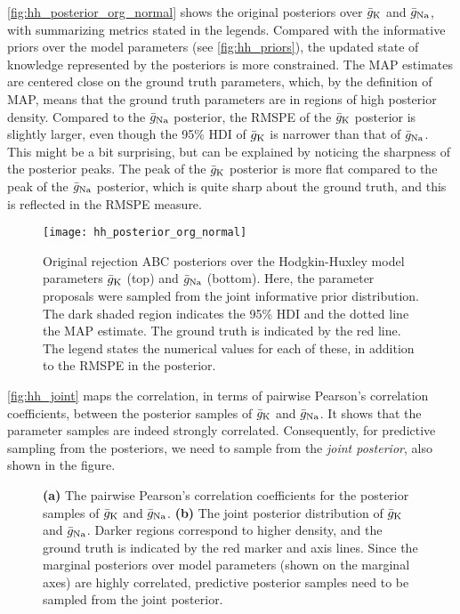 \autoref{fig:hh_posterior_org_normal} shows the original posteriors over $\bar{g}_{\mathrm{K}}$ and $\bar{g}_{\mathrm{Na}}$, with summarizing metrics stated in the legends. Compared with the informative priors over the model parameters (see \autoref{fig:hh_priors}), the updated state of knowledge represented by the posteriors is more constrained. The MAP estimates are centered close on the ground truth parameters, which, by the definition of MAP, means that the ground truth parameters are in regions of high posterior density. Compared to the $\bar{g}_{\mathrm{Na}}$ posterior, the RMSPE of the $\bar{g}_{\mathrm{K}}$ posterior is slightly larger, even though the 95\% HDI of $\bar{g}_{\mathrm{K}}$ is narrower than that of $\bar{g}_{\mathrm{Na}}$. This might be a bit surprising, but can be explained by noticing the sharpness of the posterior peaks. The peak of the $\bar{g}_{\mathrm{K}}$ posterior is more flat compared to the peak of the $\bar{g}_{\mathrm{Na}}$ posterior, which is quite sharp about the ground truth, and this is reflected in the RMSPE measure.
\begin{figure}[H]
    \centering
    \texttt{[image: hh\_posterior\_org\_normal]}
    \caption{Original rejection ABC posteriors over the Hodgkin-Huxley model parameters $\bar{g}_{\mathrm{K}}$ (top) and $\bar{g}_{\mathrm{Na}}$ (bottom). Here, the parameter proposals were sampled from the joint informative prior distribution. The dark shaded region indicates the 95\% HDI and the dotted line the MAP estimate. The ground truth is indicated by the red line. The legend states the numerical values for each of these, in addition to the RMSPE in the posterior.}
    \label{fig:hh_posterior_org_normal}
\end{figure}

\autoref{fig:hh_joint} maps the correlation, in terms of pairwise Pearson's correlation coefficients, between the posterior samples of $\bar{g}_{\mathrm{K}}$ and $\bar{g}_{\mathrm{Na}}$. It shows that the parameter samples are indeed strongly correlated. Consequently, for predictive sampling from the posteriors, we need to sample from the \textit{joint posterior}, also shown in the figure.
\begin{figure}[!htb]
\centering
{}
\qquad
{}
\caption{\textbf{(a)} The pairwise Pearson's correlation coefficients for the posterior samples of $\bar{g}_{\mathrm{K}}$ and $\bar{g}_{\mathrm{Na}}$. \textbf{(b)} The joint posterior distribution of $\bar{g}_{\mathrm{K}}$ and $\bar{g}_{\mathrm{Na}}$. Darker regions correspond to higher density, and the ground truth is indicated by the red marker and axis lines. Since the marginal posteriors over model parameters (shown on the marginal axes) are highly correlated, predictive posterior samples need to be sampled from the joint posterior. 
}
\label{fig:hh_joint}
\end{figure}

